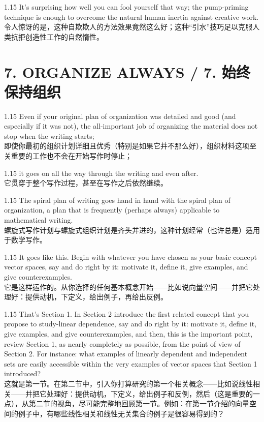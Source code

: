 \documentclass[12pt,a4paper]{article}
\newcommand{\bilingual}[2]{
    \begin{spacing}{1.15} %
        \noindent \normalsize #1 \\[-0.5ex] %
        \small \textcolor{blue!70!black}{#2} %
    \end{spacing}
    \vspace{0.8em} %
}
\begin{document}
\bilingual{It's surprising how well you can fool yourself that way; the pump-priming technique is enough to overcome the natural human inertia against creative work.}
{令人惊讶的是，这种自欺欺人的方法效果竟然这么好；这种“引水”技巧足以克服人类抗拒创造性工作的自然惰性。} %
\section*{7. ORGANIZE ALWAYS / 7. 始终保持组织} %

\bilingual{Even if your original plan of organization was detailed and good (and especially if it was not), the all-important job of organizing the material does not stop when the writing starts;}
{即使你最初的组织计划详细且优秀（特别是如果它并不那么好），组织材料这项至关重要的工作也不会在开始写作时停止；} %

\bilingual{it goes on all the way through the writing and even after.}
{它贯穿于整个写作过程，甚至在写作之后依然继续。} %

\bilingual{The spiral plan of writing goes hand in hand with the spiral plan of organization, a plan that is frequently (perhaps always) applicable to mathematical writing.}
{螺旋式写作计划与螺旋式组织计划是齐头并进的，这种计划经常（也许总是）适用于数学写作。} %

\bilingual{It goes like this. Begin with whatever you have chosen as your basic concept vector spaces, say and do right by it: motivate it, define it, give examples, and give counterexamples.}
{它是这样运作的。从你选择的任何基本概念开始——比如说向量空间——并把它处理好：提供动机，下定义，给出例子，再给出反例。} %

\bilingual{That's Section 1. In Section 2 introduce the first related concept that you propose to study-linear dependence, say and do right by it: motivate it, define it, give examples, and give counterexamples, and then, this is the important point, review Section 1, as nearly completely as possible, from the point of view of Section 2. For instance: what examples of linearly dependent and independent sets are easily accessible within the very examples of vector spaces that Section 1 introduced?}
{这就是第一节。在第二节中，引入你打算研究的第一个相关概念——比如说线性相关——并把它处理好：提供动机，下定义，给出例子和反例，然后（这是重要的一点），从第二节的视角，尽可能完整地回顾第一节。例如：在第一节介绍的向量空间的例子中，有哪些线性相关和线性无关集合的例子是很容易得到的？} %
\end{document}
